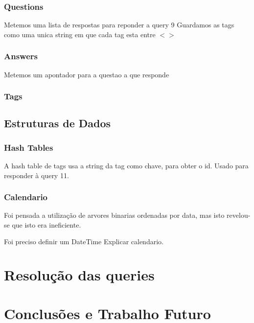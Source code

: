 \documentclass[10pt,a4paper]{report}
\begin{document}
        \subsection{Questions}
        Metemos uma lista de respostas para reponder a query 9
        Guardamos as tags como uma unica string em que cada tag esta entre
        $< >$


        \subsection{Answers}
        Metemos um apontador para a questao a que responde


        \subsection{Tags}

    \section{Estruturas de Dados}

        \subsection{Hash Tables}

        A hash table de tags usa a string da tag como chave, para obter o id.
        Usado para responder à query 11.

        \subsection{Calendario}
        Foi pensada a utilização de arvores binarias ordenadas por data, mas isto
        revelou-se que isto era ineficiente.

        Foi preciso definir um DateTime
        Explicar calendario.
    
\chapter{Resolução das queries}

\chapter{Conclusões e Trabalho Futuro}
\end{document}
